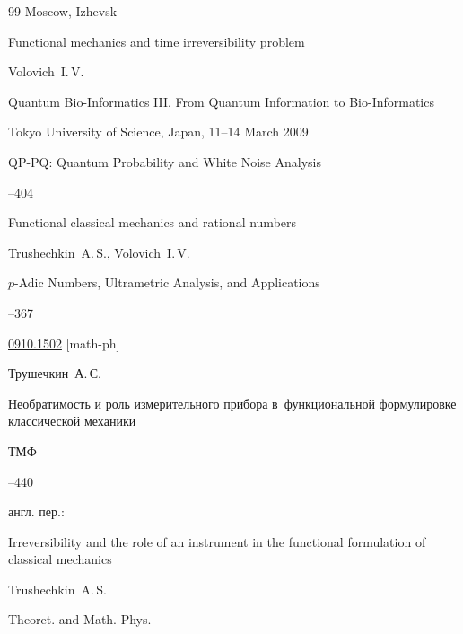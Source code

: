 \begin{thebibliography}{99}
\publaddr Moscow, Izhevsk








\paper Functional mechanics and time irreversibility problem

\by   Volovich~I.\,V.

\inbook Quantum Bio-Informatics III. From Quantum Information to Bio-Informatics

\procinfo Tokyo University of Science, Japan, 11--14 March 2009


\serial QP-PQ: Quantum Probability and White Noise Analysis 


--404




\paper Functional classical mechanics and rational numbers

\by Trushechkin~A.\,S., Volovich~I.\,V. 

\jour $p$-Adic Numbers, Ultrametric Analysis, and Applications




--367

\arxiv \href{http://arxiv.org/abs/0910.1502}{0910.1502} [math-ph]




\by Трушечкин~А.\,С.

\paper Необратимость и роль измерительного прибора в~функциональной формулировке классической механики 

\jour ТМФ




--440

\transl англ. пер.:~

\paper Irreversibility and the role of an instrument in the functional formulation of classical mechanics

\by  Trushechkin~A.\,S.

\jour Theoret. and Math. Phys.


\end{thebibliography}
